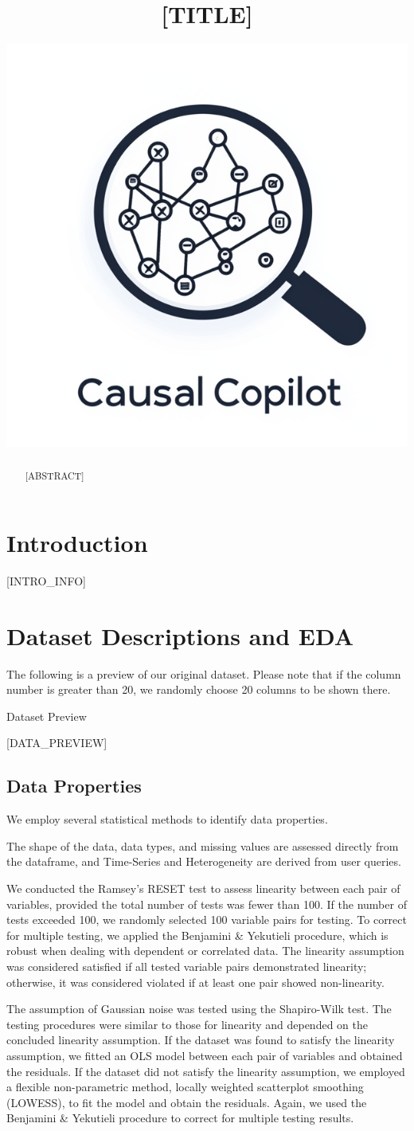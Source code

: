 \documentclass{article}
\title{[TITLE]}
\author{ \href{https://orcid.org/0000-0000-0000-0000}{\includegraphics[scale=0.06]{asset/logo.png}} }
\begin{document}
\maketitle

\begin{abstract}
[ABSTRACT]
\end{abstract}


\raggedbottom
\section{Introduction}
[INTRO_INFO]

\section{Dataset Descriptions and EDA}
The following is a preview of our original dataset. Please note that if the column number is greater than 20,
we randomly choose 20 columns to be shown there.

\begin{table}[H]
    \centering
    \caption{Dataset Preview}
    [DATA_PREVIEW]
\end{table}

\subsection{Data Properties}
We employ several statistical methods to identify data properties.

The shape of the data, data types, and missing values are assessed directly from the dataframe, and Time-Series and Heterogeneity are derived from user queries.

We conducted the Ramsey's RESET test to assess linearity between each pair of variables, provided the total number of tests was fewer than 100. If the number of tests exceeded 100, we randomly selected 100 variable pairs for testing.
To correct for multiple testing, we applied the Benjamini \& Yekutieli procedure, which is robust when dealing with dependent or correlated data. 
The linearity assumption was considered satisfied if all tested variable pairs demonstrated linearity; otherwise, it was considered violated if at least one pair showed non-linearity.

The assumption of Gaussian noise was tested using the Shapiro-Wilk test. The testing procedures were similar to those for linearity and depended on the concluded linearity assumption. 
If the dataset was found to satisfy the linearity assumption, we fitted an OLS model between each pair of variables and obtained the residuals. 
If the dataset did not satisfy the linearity assumption, we employed a flexible non-parametric method, locally weighted scatterplot smoothing (LOWESS), to fit the model and obtain the residuals. 
Again, we used the Benjamini \& Yekutieli procedure to correct for multiple testing results. 
\end{document}
